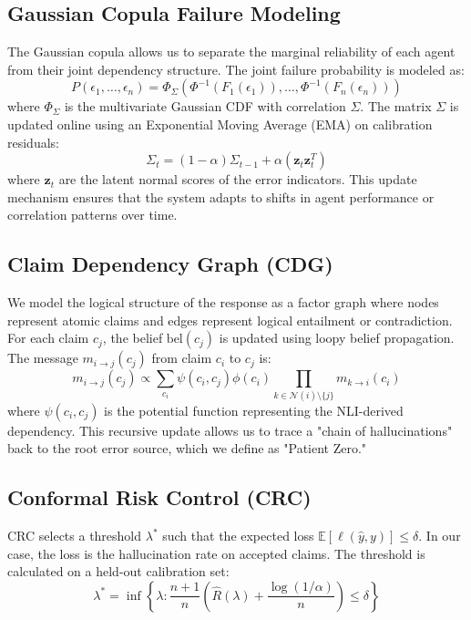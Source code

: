 \documentclass[conference]{IEEEtran}
\begin{document}
\subsection{Gaussian Copula Failure Modeling}
The Gaussian copula allows us to separate the marginal reliability of each agent from their joint dependency structure. The joint failure probability is modeled as:
\begin{equation}
  P(\epsilon_1,\ldots,\epsilon_n) = \Phi_\Sigma(\Phi^{-1}(F_1(\epsilon_1)),\ldots,\Phi^{-1}(F_n(\epsilon_n)))
\label{eq:copula}
\end{equation}
where $\Phi_\Sigma$ is the multivariate Gaussian CDF with correlation $\Sigma$. The matrix $\Sigma$ is updated online using an Exponential Moving Average (EMA) on calibration residuals:
\begin{equation}
  \Sigma_{t} = (1 - \alpha) \Sigma_{t-1} + \alpha (\mathbf{z}_t \mathbf{z}_t^T)
\end{equation}
where $\mathbf{z}_t$ are the latent normal scores of the error indicators. This update mechanism ensures that the system adapts to shifts in agent performance or correlation patterns over time.

\subsection{Claim Dependency Graph (CDG)}
We model the logical structure of the response as a factor graph where nodes represent atomic claims and edges represent logical entailment or contradiction. For each claim $c_j$, the belief $\text{bel}(c_j)$ is updated using loopy belief propagation. The message $m_{i \to j}(c_j)$ from claim $c_i$ to $c_j$ is:
\begin{equation}
  m_{i \to j}(c_j) \propto \sum_{c_i} \psi(c_i, c_j) \phi(c_i) \prod_{k \in \mathcal{N}(i) \setminus \{j\}} m_{k \to i}(c_i)
\end{equation}
where $\psi(c_i, c_j)$ is the potential function representing the NLI-derived dependency. This recursive update allows us to trace a "chain of hallucinations" back to the root error source, which we define as "Patient Zero."

\subsection{Conformal Risk Control (CRC)}
CRC selects a threshold $\lambda^*$ such that the expected loss $\mathbb{E}[\ell(\hat{y}, y)] \leq \delta$. In our case, the loss is the hallucination rate on accepted claims. The threshold is calculated on a held-out calibration set:
\begin{equation}
  \lambda^* = \inf \left\{ \lambda : \frac{n+1}{n} \left( \hat{R}(\lambda) + \frac{\log(1/\alpha)}{n} \right) \leq \delta \right\}
\end{equation}
\end{document}
